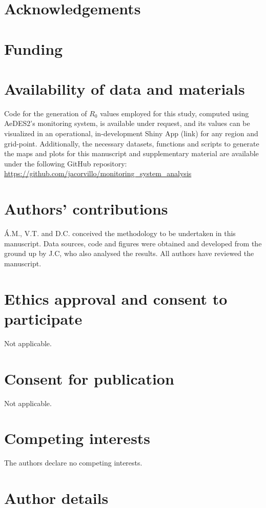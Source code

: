 \documentclass[10pt,twocolumn]{wlscirep}
\begin{document}
\section{Acknowledgements} \label{sec-acknowledgements}

\section{Funding} \label{sec-funding}

\section{Availability of data and materials} \label{sec-availability}
Code for the generation of $R_0$ values employed for this study, computed using AeDES2's monitoring system, is available under request, and its values can be visualized in an operational, in-development Shiny App (link) for any region and grid-point. Additionally, the necessary datasets, functions and scripts to generate the maps and plots for this manuscript and supplementary material are available under the following GitHub repository: \url{https://github.com/jacorvillo/monitoring_system_analysis}

\section{Authors' contributions} \label{sec-authors-contributions}

Á.M., V.T. and D.C. conceived the methodology to be undertaken in this manuscript. Data sources, code and figures were obtained and developed from the ground up by J.C, who also analysed the results. All authors have reviewed the manuscript.

\section{Ethics approval and consent to participate} \label{sec-ethics-approval}
Not applicable.

\section{Consent for publication} \label{sec-consent-for-publication}
Not applicable.

\section{Competing interests} \label{sec-competing-interests}
The authors declare no competing interests.

\section{Author details} \label{sec-author-details}


\end{document}
